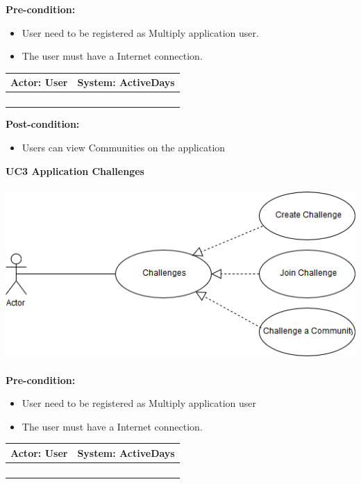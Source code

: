 \documentclass[11pt]{article}
\begin{document}
\textbf{Pre-condition: }   \\
\begin{itemize}
	\item User need to be registered as Multiply application user.
	\item The user must have a Internet connection.
\end{itemize}
\begin{center}
	\begin{tabular}{ |p{8cm}|p{8cm}| }
		\hline
		\textbf{Actor:} User & \textbf{System:} ActiveDays \\
		\hline
		&  \\
		\hline
		&  \\
		\hline
		& \\   
		\hline
		& \\
		\hline
	\end{tabular}
\end{center}		
\textbf{Post-condition: } \\
\begin{itemize}
	\item Users can view Communities on the application
\end{itemize}	
\textbf{UC3 Application Challenges}\\\\
\includegraphics[scale=0.5]{./DiagramsAzhar/Community2.png}\\\\
\textbf{Pre-condition: }   \\
\begin{itemize}
	\item User need to be registered as Multiply application user
	\item The user must have a Internet connection.
\end{itemize}
\begin{center}
	\begin{tabular}{ |p{8cm}|p{8cm}| }
		\hline
		\textbf{Actor:} User & \textbf{System:} ActiveDays \\
		\hline
		&  \\
		\hline
		&  \\
		\hline
		& \\   
		\hline
		& \\
		\hline
	\end{tabular}
\end{center}		
\end{document}
